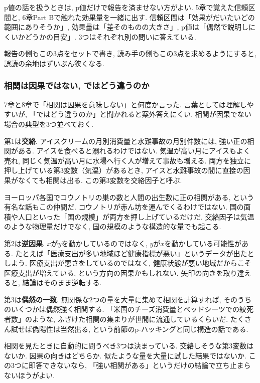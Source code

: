 p値の話を扱うときは, p値だけで報告を済ませない方がよい.
5章で覚えた信頼区間と, 6章Part Bで触れた効果量を一緒に出す.
信頼区間は「効果がだいたいどの範囲にありそうか」, 効果量は「差そのものの大きさ」, p値は「偶然で説明しにくいかどうかの目安」.
3つはそれぞれ別の問いに答えている.

報告の側もこの3点をセットで書き, 読み手の側もこの3点を求めるようにすると, 誤読の余地はずいぶん狭くなる.

\subsubsection*{相関は因果ではない, ではどう違うのか}

7章と8章で「相関は因果を意味しない」と何度か言った.
言葉としては理解しやすいが, 「ではどう違うのか」と聞かれると案外答えにくい.
相関が因果でない場合の典型を3つ並べておく.

第1は\textbf{交絡}.
アイスクリームの月別消費量と水難事故の月別件数には, 強い正の相関がある.
アイスを食べると溺れるわけではない. 気温が高い月にアイスもよく売れ, 同じく気温が高い月に水場へ行く人が増えて事故も増える.
両方を独立に押し上げている第3変数（気温）があるとき, アイスと水難事故の間に直接の因果がなくても相関は出る.
この第3変数を交絡因子と呼ぶ.

ヨーロッパ各国でコウノトリの巣の数と人間の出生数に正の相関がある, という有名な話もこの仲間だ.
コウノトリが赤ん坊を運んでくるわけではない. 国の面積や人口といった「国の規模」が両方を押し上げているだけだ.
交絡因子は気温のような物理量だけでなく, 国の規模のような構造的な量でも起こる.

第2は\textbf{逆因果}.
$x$が$y$を動かしているのではなく, $y$が$x$を動かしている可能性がある.
たとえば「医療支出が多い地域ほど健康指標が悪い」というデータが出たとしよう.
医療支出が悪さをしているのではなく, 健康状態が悪い地域だからこそ医療支出が増えている, という方向の因果かもしれない.
矢印の向きを取り違えると, 結論はそのまま逆転する.

第3は\textbf{偶然の一致}.
無関係な2つの量を大量に集めて相関を計算すれば, そのうちのいくつかは偶然強く相関する.
「米国のチーズ消費量とベッドシーツでの絞死者数」のような, ふざけた相関の集まりが世間に流通しているくらいだ.
たくさん試せば偽陽性は当然出る, という前節のp-ハッキングと同じ構造の話である.

相関を見たときに自動的に問うべき3つは決まっている.
交絡しそうな第3変数はないか. 因果の向きはどちらか. 似たような量を大量に試した結果ではないか.
この3つに即答できないなら, 「強い相関がある」というだけの結論で立ち止まらないほうがよい.

